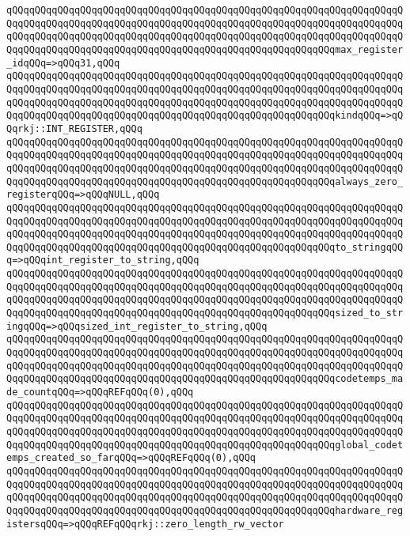 \verb|qQQqqQQqqQQqqQQqqQQqqQQqqQQqqQQqqQQqqQQqqQQqqQQqqQQqqQQqqQQqqQQqqQQqqQQqqQQqqQQqqQQqqQQqqQQqqQQqqQQqqQQqqQQqqQQqqQQqqQQqqQQqqQQqqQQqqQQqqQQqqQQqqQQqqQQqqQQqqQQqqQQqqQQqqQQqqQQqqQQqqQQqqQQqqQQqqQQqqQQqqQQqqQQqqQQqqQQqqQQqqQQqqQQqqQQqqQQqqQQqqQQqqQQqqQQqqQQqqQQqqQQqqQQqmax_register_idqQQq=>qQQq31,qQQq|\newline
\verb|qQQqqQQqqQQqqQQqqQQqqQQqqQQqqQQqqQQqqQQqqQQqqQQqqQQqqQQqqQQqqQQqqQQqqQQqqQQqqQQqqQQqqQQqqQQqqQQqqQQqqQQqqQQqqQQqqQQqqQQqqQQqqQQqqQQqqQQqqQQqqQQqqQQqqQQqqQQqqQQqqQQqqQQqqQQqqQQqqQQqqQQqqQQqqQQqqQQqqQQqqQQqqQQqqQQqqQQqqQQqqQQqqQQqqQQqqQQqqQQqqQQqqQQqqQQqqQQqqQQqqQQqqQQqkindqQQq=>qQQqrkj::INT_REGISTER,qQQq|\newline
\verb|qQQqqQQqqQQqqQQqqQQqqQQqqQQqqQQqqQQqqQQqqQQqqQQqqQQqqQQqqQQqqQQqqQQqqQQqqQQqqQQqqQQqqQQqqQQqqQQqqQQqqQQqqQQqqQQqqQQqqQQqqQQqqQQqqQQqqQQqqQQqqQQqqQQqqQQqqQQqqQQqqQQqqQQqqQQqqQQqqQQqqQQqqQQqqQQqqQQqqQQqqQQqqQQqqQQqqQQqqQQqqQQqqQQqqQQqqQQqqQQqqQQqqQQqqQQqqQQqqQQqqQQqqQQqalways_zero_registerqQQq=>qQQqNULL,qQQq|\newline
\verb|qQQqqQQqqQQqqQQqqQQqqQQqqQQqqQQqqQQqqQQqqQQqqQQqqQQqqQQqqQQqqQQqqQQqqQQqqQQqqQQqqQQqqQQqqQQqqQQqqQQqqQQqqQQqqQQqqQQqqQQqqQQqqQQqqQQqqQQqqQQqqQQqqQQqqQQqqQQqqQQqqQQqqQQqqQQqqQQqqQQqqQQqqQQqqQQqqQQqqQQqqQQqqQQqqQQqqQQqqQQqqQQqqQQqqQQqqQQqqQQqqQQqqQQqqQQqqQQqqQQqqQQqqQQqto_stringqQQq=>qQQqint_register_to_string,qQQq|\newline
\verb|qQQqqQQqqQQqqQQqqQQqqQQqqQQqqQQqqQQqqQQqqQQqqQQqqQQqqQQqqQQqqQQqqQQqqQQqqQQqqQQqqQQqqQQqqQQqqQQqqQQqqQQqqQQqqQQqqQQqqQQqqQQqqQQqqQQqqQQqqQQqqQQqqQQqqQQqqQQqqQQqqQQqqQQqqQQqqQQqqQQqqQQqqQQqqQQqqQQqqQQqqQQqqQQqqQQqqQQqqQQqqQQqqQQqqQQqqQQqqQQqqQQqqQQqqQQqqQQqqQQqqQQqqQQqsized_to_stringqQQq=>qQQqsized_int_register_to_string,qQQq|\newline
\verb|qQQqqQQqqQQqqQQqqQQqqQQqqQQqqQQqqQQqqQQqqQQqqQQqqQQqqQQqqQQqqQQqqQQqqQQqqQQqqQQqqQQqqQQqqQQqqQQqqQQqqQQqqQQqqQQqqQQqqQQqqQQqqQQqqQQqqQQqqQQqqQQqqQQqqQQqqQQqqQQqqQQqqQQqqQQqqQQqqQQqqQQqqQQqqQQqqQQqqQQqqQQqqQQqqQQqqQQqqQQqqQQqqQQqqQQqqQQqqQQqqQQqqQQqqQQqqQQqqQQqqQQqqQQqcodetemps_made_countqQQq=>qQQqREFqQQq(0),qQQq|\newline
\verb|qQQqqQQqqQQqqQQqqQQqqQQqqQQqqQQqqQQqqQQqqQQqqQQqqQQqqQQqqQQqqQQqqQQqqQQqqQQqqQQqqQQqqQQqqQQqqQQqqQQqqQQqqQQqqQQqqQQqqQQqqQQqqQQqqQQqqQQqqQQqqQQqqQQqqQQqqQQqqQQqqQQqqQQqqQQqqQQqqQQqqQQqqQQqqQQqqQQqqQQqqQQqqQQqqQQqqQQqqQQqqQQqqQQqqQQqqQQqqQQqqQQqqQQqqQQqqQQqqQQqqQQqqQQqglobal_codetemps_created_so_farqQQq=>qQQqREFqQQq(0),qQQq|\newline
\verb|qQQqqQQqqQQqqQQqqQQqqQQqqQQqqQQqqQQqqQQqqQQqqQQqqQQqqQQqqQQqqQQqqQQqqQQqqQQqqQQqqQQqqQQqqQQqqQQqqQQqqQQqqQQqqQQqqQQqqQQqqQQqqQQqqQQqqQQqqQQqqQQqqQQqqQQqqQQqqQQqqQQqqQQqqQQqqQQqqQQqqQQqqQQqqQQqqQQqqQQqqQQqqQQqqQQqqQQqqQQqqQQqqQQqqQQqqQQqqQQqqQQqqQQqqQQqqQQqqQQqqQQqqQQqhardware_registersqQQq=>qQQqREFqQQqrkj::zero_length_rw_vector|\newline

